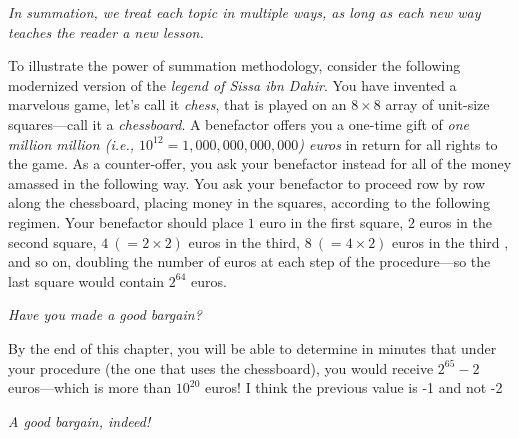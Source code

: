 {\em In summation, we treat each topic in multiple ways, as long as
  each new way teaches the reader a new lesson.}

\bigskip








To illustrate the power of summation methodology, consider the
following modernized version of the {\it legend of Sissa ibn Dahir}.
You have invented a marvelous game, let's call it {\it chess}, that is
played on an $8 \times 8$ array of unit-size squares---call it a {\it
  chessboard}.  A benefactor offers you a one-time gift of {\em one
  million million (i.e., $10^{12} = 1,000,000,000,000$) euros} in
return for all rights to the game.  As a counter-offer, you ask your
benefactor instead for all of the money amassed in the following way.
You ask your benefactor to proceed row by row along the chessboard,
placing money in the squares, according to the following regimen.
Your benefactor should place $1$ euro in the first square, $2$ euros
in the second square, $4 \ (= 2 \times 2)$ euros in the third, $8 \ (=
4 \times 2)$ euros in the third , and so on, doubling the number of
euros at each step of the procedure---so the last square would contain
$2^{64}$ euros.

\noindent
{\em Have you made a good bargain?}

\medskip

By the end of this chapter, you will be able to determine in minutes
that under your procedure (the one that uses the chessboard), you
would receive $2^{65} -2$ euros---which is more than $10^{20}$ euros!
{\Denis I think the previous value is -1 and not -2}

\noindent
{\em A good bargain, indeed!}



